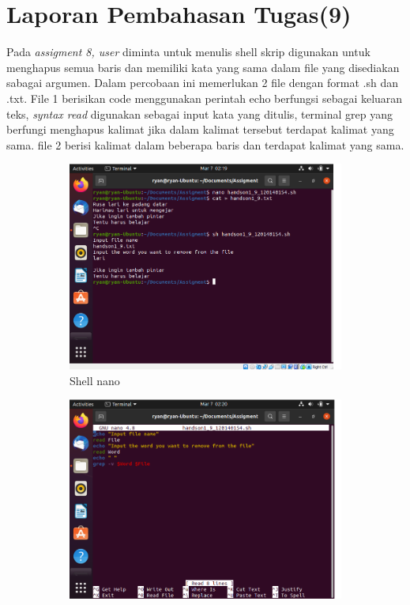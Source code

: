 \documentclass[11pt,a4paper]{article}
\begin{document}
\section{Laporan Pembahasan Tugas(9)}
    Pada \textit{assigment 8, user} diminta untuk menulis shell skrip digunakan untuk menghapus semua baris dan memiliki kata yang sama dalam file yang disediakan sabagai argumen. Dalam percobaan ini memerlukan 2 file dengan format .sh dan .txt. File 1 berisikan code menggunakan perintah echo berfungsi sebagai keluaran teks, \textit{syntax read} digunakan sebagai input kata yang ditulis, terminal grep yang berfungi menghapus kalimat jika dalam kalimat tersebut terdapat kalimat yang sama. file 2 berisi kalimat dalam beberapa baris dan terdapat kalimat yang sama.
    \begin{figure}[h]
	\centering
	\begin{subfigure}[b]{0.4\textwidth}
		\centering
		\def\svgwidth{\columnwidth}
		\includegraphics[width=1\textwidth]{Gambar/Assigment 9 command.png}
		\caption{Shell nano}
		\label{fig:aug-1}
	\end{subfigure}
	\qquad %
	\begin{subfigure}[b]{0.4\textwidth}
		\centering
		\def\svgwidth{\columnwidth}
		\includegraphics[width=1\textwidth]{Gambar/Assigment 9 shell.png}

\end{subfigure}
\end{figure}
\end{document}
